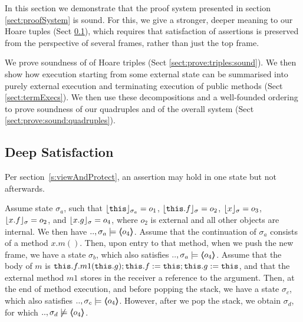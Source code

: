 

In this section we demonstrate that the proof system presented in section \ref{sect:proofSystem} is sound. 
For this, we give a stronger, deeper meaning to our Hoare tuples  (Sect \ref{s:deep:valid}), which requires that satisfaction of assertions is preserved from the perspective of several frames, rather than just the top frame.

We prove soundness of of Hoare triples (Sect \ref{sect:prove:triples:sound}).
We then show how execution starting from some external state can be summarised into purely external execution and terminating execution of public methods (Sect \ref{sect:termExecs}). We then use these decompositions and a well-founded ordering to prove soundness of our quadruples  and of the overall system (Sect \ref{sect:prove:sound:quadruples}).


\subsection{Deep Satisfaction} 
\label{s:deep:valid}


Per section~\ref{s:viewAndProtect}, an assertion may hold in one state
but not afterwards.



\begin{example}
\label{ex:motivate:deep}
Assume state $\sigma_a$, such that $\interpret {\sigma_a} {\prg{this}}=o_1$, $\interpret {\sigma} {\prg{this}.f}=o_2$, $\interpret {\sigma} {x}=o_3$, $\interpret {\sigma} {x.f}=o_2$,  
and $\interpret {\sigma} {x.g}=o_4$, where $o_2$ is external and all other objects are internal. 
We then have $..,\sigma_a \models  \inside {o_4}$.
Assume that the continuation of $\sigma_a$   consists of a method $x.m()$. Then,
upon entry to that method, when we push the new frame, we have a state $\sigma_b$, which also satisfies $..,\sigma_a \models  \inside {o_4}$.
Assume that the   body of $m$ is $\prg{this}.f.m1(\prg{this}.g); \prg{this}.f := \prg{this};  \prg{this}.g := \prg{this}$, and that the external method $m1$ stores in the 
receiver a reference to the argument.
Then, at the end of method execution, and before popping the stack, we have a state $\sigma_c$, which also satisfies $..,\sigma_c \models  \inside {o_4}$.
However, after we pop the stack, we obtain $\sigma_d$, for which $..,\sigma_d \not\models  \inside {o_4}$.
\end{example}
 

